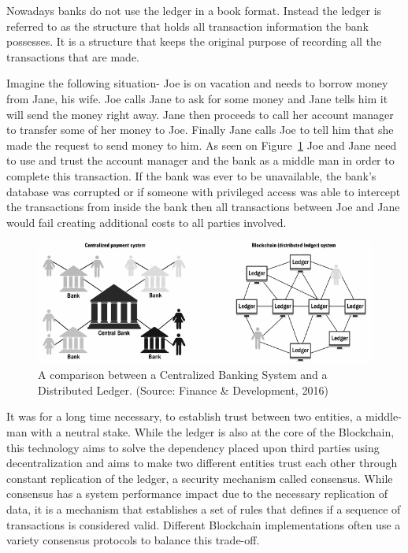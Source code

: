 Nowadays banks do not use the ledger in a book format. Instead the ledger is
referred to as the structure that holds all transaction information the bank
possesses. It is a structure that keeps the original purpose of recording all
the transactions that are made.

Imagine the following situation- Joe is on vacation and needs to borrow money
from Jane, his wife. Joe calls Jane to ask for some money and Jane tells him it
will send the money right away. Jane then proceeds to call her account manager
to transfer some of her money to Joe. Finally Jane calls Joe to tell him that
she made the request to send money to him.  As seen on
Figure~\ref{fig:centralizedvsdescentralized} Joe and Jane need to use and trust
the account manager and the bank as a middle man in order to complete this
transaction. If the bank was ever to be unavailable, the bank's database was
corrupted or if someone with  privileged access was able to intercept the
transactions from inside the bank then all transactions between Joe and Jane
would fail creating additional costs to all parties involved. 

\begin{figure}[h]
  \centering
  \includegraphics[width=1\linewidth]{imgs/blockchainvscentralizedNetwork.png}
  \caption{\label{fig:centralizedvsdescentralized} A comparison between a
  Centralized Banking System and a Distributed Ledger. (Source: Finance \&
  Development, 2016)}
\end{figure}

It was for a long time necessary, to establish trust between two entities, a
middle-man with a neutral stake. While the ledger is also at the core of the
Blockchain, this technology aims to solve the dependency placed upon third
parties using decentralization and aims to make two different entities trust
each other through constant replication of the ledger, a security mechanism
called consensus.  While consensus has a system performance impact due to the
necessary replication of data, it is a mechanism that establishes a set of
rules that defines if a sequence of transactions is considered valid.
Different Blockchain implementations often use a variety consensus protocols to
balance this trade-off.

